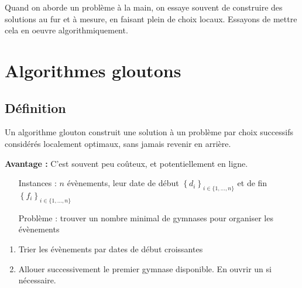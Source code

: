 
Quand on aborde un problème à la main, on essaye souvent de construire des solutions au fur et à mesure, en faisant plein de choix locaux. Essayons de mettre cela en oeuvre algorithmiquement.

\section{Algorithmes gloutons}

\subsection{Définition}

\begin{definition}
	Un algorithme glouton construit une solution à un problème par choix successifs considérés localement optimaux, sans jamais revenir en arrière.
\end{definition}

\textbf{Avantage :} C'est souvent peu coûteux, et potentiellement en ligne.

\begin{example}[Gymnases]\enspace
	\begin{itemize}
		\item[Instances :] $n$ évènements, leur date de début $\left\{d_i\right\}_{i \in \{1, \dots, n\}}$ et de fin $\left\{f_i\right\}_{i \in \{1, \dots, n\}}$
		\item[Problème :] trouver un nombre minimal de gymnases pour organiser les évènements
	\end{itemize}
\end{example}

\begin{algo}\enspace
	\begin{enumerate}
		\item Trier les évènements par dates de début croissantes
		\item Allouer successivement le premier gymnase disponible. En ouvrir un si nécessaire.
	\end{enumerate}
\end{algo}